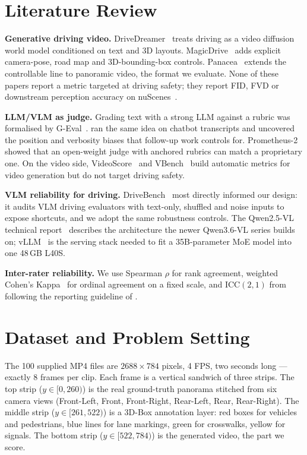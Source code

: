 \documentclass[letterpaper]{article}
\begin{document}
\section{Literature Review}
\textbf{Generative driving video.}
DriveDreamer~\citep{wang2024drivedreamer} treats driving as a video
diffusion world model conditioned on text and 3D layouts.
MagicDrive~\citep{gao2024magicdrive} adds explicit camera-pose, road
map and 3D-bounding-box controls. Panacea~\citep{wen2024panacea}
extends the controllable line to panoramic video, the format we
evaluate. None of these papers report a metric targeted at driving
safety; they report FID, FVD or downstream perception accuracy on
nuScenes~\citep{caesar2020nuscenes}.

\textbf{LLM/VLM as judge.}
Grading text with a strong LLM against a rubric was formalised by
G-Eval~\citep{liu2023geval}. \citet{zheng2023judging} ran the same
idea on chatbot transcripts and uncovered the position and verbosity
biases that follow-up work controls for.
Prometheus-2~\citep{kim2024prometheus} showed that an open-weight
judge with anchored rubrics can match a proprietary one. On the video
side, VideoScore~\citep{he2024videoscore} and
VBench~\citep{huang2024vbench} build automatic metrics for video
generation but do not target driving safety.

\textbf{VLM reliability for driving.}
DriveBench~\citep{xie2024drivebench} most directly informed our
design: it audits VLM driving evaluators with text-only, shuffled and
noise inputs to expose shortcuts, and we adopt the same robustness
controls. The Qwen2.5-VL technical
report~\citep{bai2025qwen2vl} describes the architecture the newer
Qwen3.6-VL series builds on; vLLM~\citep{kwon2023vllm} is the serving
stack needed to fit a 35B-parameter MoE model into one 48\,GB L40S.

\textbf{Inter-rater reliability.}
We use Spearman $\rho$ for rank agreement, weighted Cohen's
Kappa~\citep{cohen1968weightedkappa} for ordinal agreement on a fixed
scale, and ICC$(2,1)$ from \citet{shrout1979intraclass} following the
reporting guideline of \citet{koo2016iccguideline}.

\section{Dataset and Problem Setting}
The 100 supplied MP4 files are $2688\!\times\!784$ pixels, 4 FPS, two
seconds long --- exactly 8 frames per clip. Each frame is a vertical
sandwich of three strips. The top strip ($y\!\in\![0,260)$) is the
real ground-truth panorama stitched from six camera views (Front-Left,
Front, Front-Right, Rear-Left, Rear, Rear-Right). The middle strip
($y\!\in\![261,522)$) is a 3D-Box annotation layer: red boxes for
vehicles and pedestrians, blue lines for lane markings, green for
crosswalks, yellow for signals. The bottom strip ($y\!\in\![522,784)$)
is the generated video, the part we score.
\end{document}
